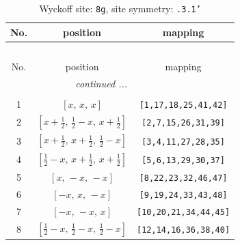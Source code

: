 \documentclass[fleqn,8pt]{jsarticle}
\begin{document}
\begin{longtable}{ccc}
\caption{Wyckoff site: {\tt 8g}, site symmetry: {\tt .3.1'}}
 \\
 \hline \hline
No. & position & mapping \\ \hline \endfirsthead

\multicolumn{2}{l}{\tablename\ \thetable{}} \\
 \hline \hline
No. & position & mapping \\ \hline \endhead

 \hline \hline
\multicolumn{2}{r}{\footnotesize\it continued ...} \\ \endfoot

 \hline \hline
\multicolumn{2}{r}{} \\ \endlastfoot

1 & $\left[ x,\, x,\, x \right]$ & {\tt [1,17,18,25,41,42]} \\ \hline
2 & $\left[ x + \frac{1}{2},\, \frac{1}{2} - x,\, x + \frac{1}{2} \right]$ & {\tt [2,7,15,26,31,39]} \\ \hline
3 & $\left[ x + \frac{1}{2},\, x + \frac{1}{2},\, \frac{1}{2} - x \right]$ & {\tt [3,4,11,27,28,35]} \\ \hline
4 & $\left[ \frac{1}{2} - x,\, x + \frac{1}{2},\, x + \frac{1}{2} \right]$ & {\tt [5,6,13,29,30,37]} \\ \hline
5 & $\left[ x,\, - x,\, - x \right]$ & {\tt [8,22,23,32,46,47]} \\ \hline
6 & $\left[ - x,\, x,\, - x \right]$ & {\tt [9,19,24,33,43,48]} \\ \hline
7 & $\left[ - x,\, - x,\, x \right]$ & {\tt [10,20,21,34,44,45]} \\ \hline
8 & $\left[ \frac{1}{2} - x,\, \frac{1}{2} - x,\, \frac{1}{2} - x \right]$ & {\tt [12,14,16,36,38,40]} \\
\end{longtable}
\renewcommand{\arraystretch}{1.2}
\end{document}
